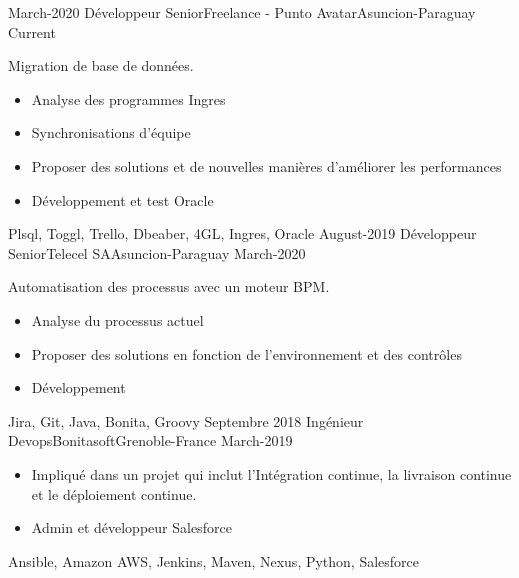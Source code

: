 %
%
%
\begin{experiences}
 \experience
    {March-2020}   {Développeur Senior}{Freelance - Punto Avatar}{Asuncion-Paraguay}
    {Current} {Migration de base de données.
                      \begin{itemize}
                          \item Analyse des programmes Ingres
                          \item Synchronisations d'équipe
                          \item Proposer des solutions et de nouvelles manières d'améliorer les performances
                          \item Développement et test Oracle
                       \end{itemize}
                  }
                      {Plsql, Toggl, Trello, Dbeaber, 4GL, Ingres, Oracle}
  \emptySeparator
 \experience
    {August-2019}   {Développeur Senior}{Telecel SA}{Asuncion-Paraguay}
    {March-2020} {Automatisation des processus avec un moteur BPM.
                      \begin{itemize}
                          \item Analyse du processus actuel
                          \item Proposer des solutions en fonction de l'environnement et des contrôles
                          \item Développement
                       \end{itemize}
                  }
                      {Jira, Git, Java, Bonita, Groovy}
  \emptySeparator
  \experience
    {Septembre 2018}   {Ingénieur Devops}{Bonitasoft}{Grenoble-France}
    {March-2019} {
                      \begin{itemize}
                        \item Impliqué dans un projet qui inclut l'Intégration continue, la livraison continue et le déploiement continue.
                        \item Admin et développeur Salesforce
                      \end{itemize}
                    }
                    {Ansible, Amazon AWS, Jenkins, Maven, Nexus, Python, Salesforce}

\end{experiences}
